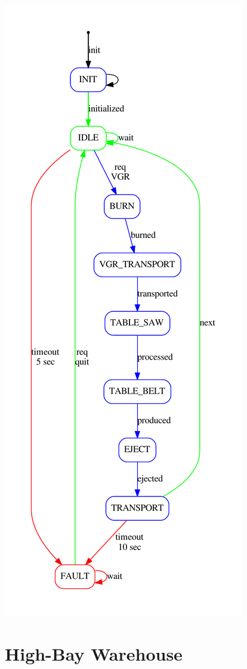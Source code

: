 \begin{DoxyImageNoCaption}
  \mbox{\includegraphics[width=\textwidth,height=\textheight/2,keepaspectratio=true]{dot_TxtMultiProcessingStationRun}}
\end{DoxyImageNoCaption}
\hypertarget{Overview State Machines_HBW}{}\section{High-\/\+Bay Warehouse}\label{Overview State Machines_HBW}

